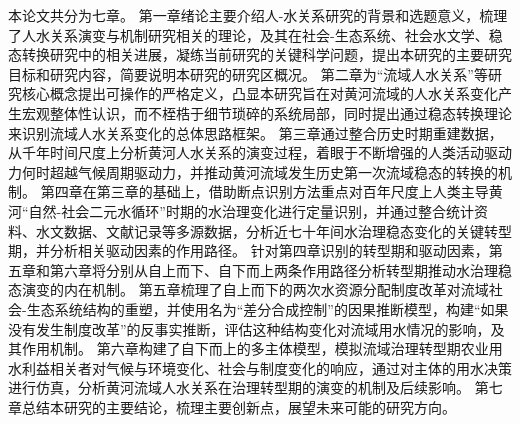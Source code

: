 本论文共分为七章。
第一章绪论主要介绍人-水关系研究的背景和选题意义，梳理了人水关系演变与机制研究相关的理论，及其在社会-生态系统、社会水文学、稳态转换研究中的相关进展，凝练当前研究的关键科学问题，提出本研究的主要研究目标和研究内容，简要说明本研究的研究区概况。
第二章为“流域人水关系”等研究核心概念提出可操作的严格定义，凸显本研究旨在对黄河流域的人水关系变化产生宏观整体性认识，而不桎梏于细节琐碎的系统局部，同时提出通过稳态转换理论来识别流域人水关系变化的总体思路框架。
第三章通过整合历史时期重建数据，从千年时间尺度上分析黄河人水关系的演变过程，着眼于不断增强的人类活动驱动力何时超越气候周期驱动力，并推动黄河流域发生历史第一次流域稳态的转换的机制。
第四章在第三章的基础上，借助断点识别方法重点对百年尺度上人类主导黄河“自然-社会二元水循环”时期的水治理变化进行定量识别，并通过整合统计资料、水文数据、文献记录等多源数据，分析近七十年间水治理稳态变化的关键转型期，并分析相关驱动因素的作用路径。
针对第四章识别的转型期和驱动因素，第五章和第六章将分别从自上而下、自下而上两条作用路径分析转型期推动水治理稳态演变的内在机制。
第五章梳理了自上而下的两次水资源分配制度改革对流域社会-生态系统结构的重塑，并使用名为“差分合成控制”的因果推断模型，构建“如果没有发生制度改革”的反事实推断，评估这种结构变化对流域用水情况的影响，及其作用机制。
第六章构建了自下而上的多主体模型，模拟流域治理转型期农业用水利益相关者对气候与环境变化、社会与制度变化的响应，通过对主体的用水决策进行仿真，分析黄河流域人水关系在治理转型期的演变的机制及后续影响。
第七章总结本研究的主要结论，梳理主要创新点，展望未来可能的研究方向。